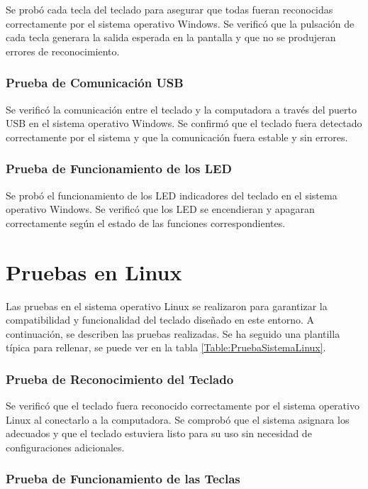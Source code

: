 Se probó cada tecla del teclado para asegurar que todas fueran reconocidas correctamente por el sistema operativo \gls{Windows}. Se verificó que la pulsación de cada tecla generara la salida esperada en la pantalla y que no se produjeran errores de reconocimiento.

\subsubsection{Prueba de Comunicación \gls{USB}}

Se verificó la comunicación entre el teclado y la computadora a través del puerto \gls{USB} en el sistema operativo \gls{Windows}. Se confirmó que el teclado fuera detectado correctamente por el sistema y que la comunicación fuera estable y sin errores.

\subsubsection{Prueba de Funcionamiento de los \gls{LED}}

Se probó el funcionamiento de los \gls{LED} indicadores del teclado en el sistema operativo \gls{Windows}. Se verificó que los \gls{LED} se encendieran y apagaran correctamente según el estado de las funciones correspondientes.

\section{Pruebas en \gls{Linux}}

Las pruebas en el sistema operativo \gls{Linux} se realizaron para garantizar la compatibilidad y funcionalidad del teclado diseñado en este entorno. A continuación, se describen las pruebas realizadas. Se ha seguido una plantilla típica para rellenar, se puede ver en la tabla \ref{Table:PruebaSistemaLinux}.

\subsubsection{Prueba de Reconocimiento del Teclado}

Se verificó que el teclado fuera reconocido correctamente por el sistema operativo \gls{Linux} al conectarlo a la computadora. Se comprobó que el sistema asignara los  adecuados y que el teclado estuviera listo para su uso sin necesidad de configuraciones adicionales.

\subsubsection{Prueba de Funcionamiento de las Teclas}

